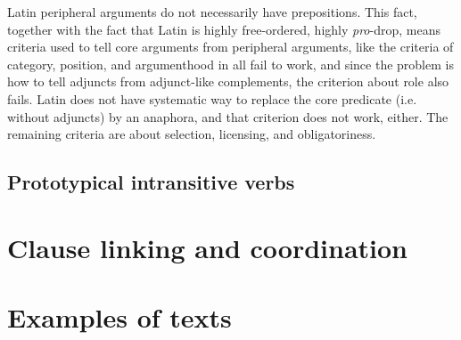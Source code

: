 \documentclass[UTF8, a4paper, oneside]{report}
\newcommand*{\citesec}[1]{\S~{#1}}
\newcommand*{\term}[1]{\emph{#1}}
\begin{document}
Latin peripheral arguments do not necessarily have prepositions.
This fact, together with the fact that Latin is highly free-ordered, 
highly \term{pro}-drop,
means criteria used to tell core arguments from peripheral arguments, 
like the criteria of category, position, and argumenthood in \citet[\citesec{4.1.2}]{cgel} 
all fail to work,
and since the problem is how to tell adjuncts from adjunct-like complements,
the criterion about role also fails.
Latin does not have systematic way to replace the core predicate (i.e. without adjuncts) by an anaphora,
and that criterion does not work, either.
The remaining criteria are about selection, licensing, and obligatoriness.


\section{Prototypical intransitive verbs}

\chapter{Clause linking and coordination}

\chapter{Examples of texts}



\end{document}
